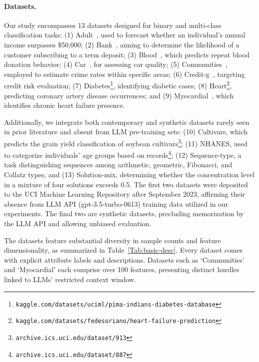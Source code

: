 \paragraph{Datasets.}
Our study encompasses 13 datasets designed for binary and multi-class classification tasks: (1) Adult~\cite{asuncion2007uci}, used to forecast whether an individual’s annual income surpasses \$50,000; (2) Bank~\cite{moro2014data}, aiming to determine the likelihood of a customer subscribing to a term deposit; (3) Blood~\cite{yeh2009knowledge}, which predicts repeat blood donation behavior; (4) Car~\cite{kadra2021well}, for assessing car quality; (5) Communities~\cite{misc_communities_and_crime_183}, employed to estimate crime rates within specific areas; (6) Credit-g~\cite{kadra2021well}, targeting credit risk evaluation; (7) Diabetes\footnote{\texttt{kaggle.com/datasets/uciml/pima-indians-diabetes-database}}, identifying diabetic cases; (8) Heart\footnote{\texttt{kaggle.com/datasets/fedesoriano/heart-failure-prediction}}, predicting coronary artery disease occurrences; and (9) Myocardial~\cite{misc_myocardial_infarction_complications_579}, which identifies chronic heart failure presence.

Additionally, we integrate both contemporary and synthetic datasets rarely seen in prior literature and absent from LLM pre-training sets: (10) Cultivars, which predicts the grain yield classification of soybean cultivars\footnote{\texttt{archive.ics.uci.edu/dataset/913}}; (11) NHANES, used to categorize individuals’ age groups based on records\footnote{\texttt{archive.ics.uci.edu/dataset/887}}; (12) Sequence-type, a task distinguishing sequences among arithmetic, geometric, Fibonacci, and Collatz types; and (13) Solution-mix, determining whether the concentration level in a mixture of four solutions exceeds 0.5. The first two datasets were deposited to the UCI Machine Learning Repository after September 2023, affirming their absence from LLM API (gpt-3.5-turbo-0613) training data utilized in our experiments. The final two are synthetic datasets, precluding memorization by the LLM API and allowing unbiased evaluation.

The datasets feature substantial diversity in sample counts and feature dimensionality, as summarized in Table~\ref{Tab:basic-desc}. Every dataset comes with explicit attribute labels and descriptions. Datasets such as ‘Communities’ and ‘Myocardial’ each comprise over 100 features, presenting distinct hurdles linked to LLMs’ restricted context window.

\vspace*{-0.12in}
